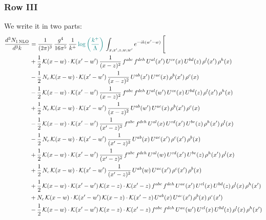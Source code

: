 \documentclass[9pt]{article}
\numberwithin{equation}{section}
\begin{document}
\subsubsection{Row III}
We write it in two parts: 
\begin{align}
\frac{d^{3}N_{1\,\mathrm{NLO}}}{d^{3}k} & = \frac{1}{(2\pi)^{3}}\,\frac{g^{4}}{16\pi^{5}}\,\frac{1}{k^{+}}\,{\color{teal}\log{\left(\frac{k^{+}}{\Lambda}\right)}}\,\int_{x,x',z,w,w'}e^{-ik(w'-w)}\,\Bigg[\notag\\ &  +\frac{1}{2}\,\mathcal{K}(x-w)\cdot\mathcal{K}(x'-w')\,\frac{1}{(x-z)^{2}}\,f^{abc}\,f^{deh}\,U^{al}(x')\,U^{ce}(x)\,U^{bd}(z)\,\rho^{l}(x')\,\rho^{h}(x)\notag\\
& -\frac{1}{2}\,N_{c}\,\mathcal{K}(x-w)\cdot\mathcal{K}(x'-w')\,\frac{1}{(x-z)^{2}}\,U^{ab}(x')\,U^{ac}(x)\,\rho^{b}(x')\,\rho^{c}(x)\notag\\
& -\frac{1}{2}\,\mathcal{K}(x-w)\cdot\mathcal{K}(x'-w')\,\frac{1}{(x-z)^{2}}\,f^{abc}\,f^{deh}\,U^{al}(w')\,U^{ce}(x)\,U^{bd}(z)\,\rho^{l}(x')\,\rho^{h}(x)\notag\\
& +\frac{1}{2}\,N_{c}\,\mathcal{K}(x-w)\cdot\mathcal{K}(x'-w')\,\frac{1}{(x-z)^{2}}\,U^{ab}(w')\,U^{ac}(x)\,\rho^{b}(x')\,\rho^{c}(x)\notag\\
& -\frac{1}{2}\,\mathcal{K}(x-w)\cdot\mathcal{K}(x'-w')\,\frac{1}{(x'-z)^{2}}\,f^{abc}\,f^{deh}\,U^{al}(x)\,U^{cd}(x')\,U^{be}(z)\,\rho^{h}(x')\,\rho^{l}(x)\notag\\
& -\frac{1}{2}\,N_{c}\,\mathcal{K}(x-w)\cdot\mathcal{K}(x'-w')\,\frac{1}{(x'-z)^{2}}\,U^{ab}(x)\,U^{ac}(x')\,\rho^{c}(x')\,\rho^{b}(x)\notag\\
& +\frac{1}{2}\,\mathcal{K}(x-w)\cdot\mathcal{K}(x'-w')\,\frac{1}{(x'-z)^{2}}\,f^{abc}\,f^{deh}\,U^{al}(w)\,U^{cd}(x')\,U^{be}(z)\,\rho^{h}(x')\,\rho^{l}(x)\notag\\
& +\frac{1}{2}\,N_{c}\,\mathcal{K}(x-w)\cdot\mathcal{K}(x'-w')\,\frac{1}{(x'-z)^{2}}\,U^{ab}(w)\,U^{ac}(x')\,\rho^{c}(x')\,\rho^{b}(x)\notag\\
& +\frac{1}{2}\,\mathcal{K}(x-w)\cdot\mathcal{K}(x'-w')\,\mathcal{K}(x-z)\cdot\mathcal{K}(x'-z)\,f^{abc}\,f^{deh}\,U^{ae}(x')\,U^{cl}(x)\,U^{bd}(z)\,\rho^{l}(x)\,\rho^{h}(x')\notag\\
& +N_{c}\,\mathcal{K}(x-w)\cdot\mathcal{K}(x'-w')\,\mathcal{K}(x-z)\cdot\mathcal{K}(x'-z)\,U^{ab}(x)\,U^{ac}(x')\,\rho^{b}(x)\,\rho^{c}(x')\notag\\
& -\frac{1}{2}\,\mathcal{K}(x-w)\cdot\mathcal{K}(x'-w')\,\mathcal{K}(x-z)\cdot\mathcal{K}(x'-z)\,f^{abc}\,f^{deh}\,U^{ae}(w')\,U^{cl}(x)\,U^{bd}(z)\,\rho^{l}(x)\,\rho^{h}(x')\notag\\

\end{align}
\end{document}
